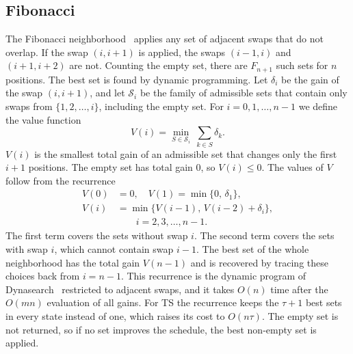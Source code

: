 \documentclass[10pt,twoside,twocolumn,a4paper]{article}
\newif\ifrevmarks \revmarksfalse
\newenvironment{revblock}{\ifrevmarks\color{red}\fi}{}
\begin{document}
\subsection{Fibonacci}
\begin{revblock}
The Fibonacci neighborhood~\cite{WojewodzkiBozejko2026} applies any set of adjacent swaps that do not overlap. If the swap $(i,i+1)$ is applied, the swaps $(i-1,i)$ and $(i+1,i+2)$ are not. Counting the empty set, there are $F_{n+1}$ such sets for $n$ positions. The best set is found by dynamic programming. Let $\delta_i$ be the gain of the swap $(i,i+1)$, and let $\mathcal{S}_i$ be the family of admissible sets that contain only swaps from $\{1,2,\dots,i\}$, including the empty set. For $i=0,1,\dots,n-1$ we define the value function
\begin{equation}\label{eq:fibV}
V(i)=\min_{S\in\mathcal{S}_i}\ \sum_{k\in S}\delta_k .
\end{equation}
$V(i)$ is the smallest total gain of an admissible set that changes only the first $i+1$ positions. The empty set has total gain $0$, so $V(i)\le 0$. The values of $V$ follow from the recurrence
\begin{align}
V(0)&=0, \quad V(1)=\min\{0,\,\delta_1\}, \label{eq:fib0}\\
V(i)&=\min\{V(i-1),\,V(i-2)+\delta_i\}, \nonumber\\
&\qquad i=2,3,\dots,n-1. \label{eq:fibrec}
\end{align}
The first term covers the sets without swap $i$. The second term covers the sets with swap $i$, which cannot contain swap $i-1$. The best set of the whole neighborhood has the total gain $V(n-1)$ and is recovered by tracing these choices back from $i=n-1$. This recurrence is the dynamic program of Dynasearch~\cite{Congram2002} restricted to adjacent swaps, and it takes $O(n)$ time after the $O(mn)$ evaluation of all gains. For TS the recurrence keeps the $\tau+1$ best sets in every state instead of one, which raises its cost to $O(n\tau)$. The empty set is not returned, so if no set improves the schedule, the best non-empty set is applied.
\end{revblock}
\end{document}
